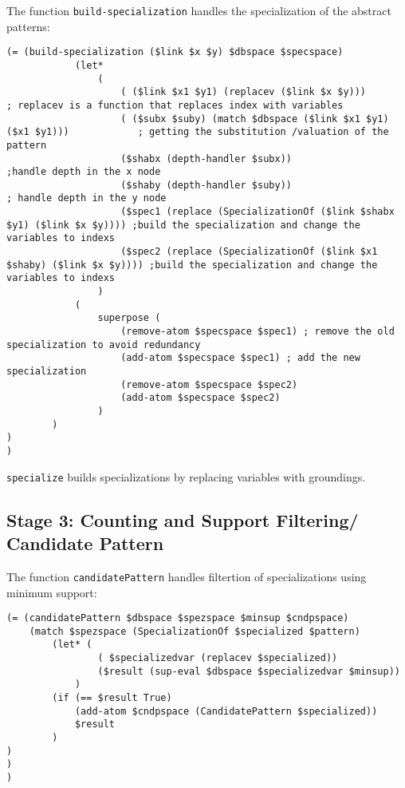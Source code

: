 \documentclass{article}
\begin{document}
The function \texttt{build-specialization} handles the specialization of the abstract patterns:

\begin{verbatim}
(= (build-specialization ($link $x $y) $dbspace $specspace) 
            (let*
                (
                    ( ($link $x1 $y1) (replacev ($link $x $y)))                            ; replacev is a function that replaces index with variables
                    ( ($subx $suby) (match $dbspace ($link $x1 $y1) ($x1 $y1)))            ; getting the substitution /valuation of the pattern
                    ($shabx (depth-handler $subx))                                    ;handle depth in the x node
                    ($shaby (depth-handler $suby))                                    ; handle depth in the y node
                    ($spec1 (replace (SpecializationOf ($link $shabx $y1) ($link $x $y)))) ;build the specialization and change the variables to indexs 
                    ($spec2 (replace (SpecializationOf ($link $x1 $shaby) ($link $x $y)))) ;build the specialization and change the variables to indexs
                )
            (
                superpose (
                    (remove-atom $specspace $spec1) ; remove the old specialization to avoid redundancy
                    (add-atom $specspace $spec1) ; add the new specialization
                    (remove-atom $specspace $spec2)
                    (add-atom $specspace $spec2)
                )
        )
)
)
\end{verbatim}

\texttt{specialize} builds specializations by replacing variables with groundings.

\subsection{Stage 3: Counting and Support Filtering/ Candidate Pattern}

The function \texttt{candidatePattern} handles filtertion of specializations using minimum support:

\begin{verbatim}
(= (candidatePattern $dbspace $spezspace $minsup $cndpspace)
    (match $spezspace (SpecializationOf $specialized $pattern)
        (let* (
                ( $specializedvar (replacev $specialized))
                ($result (sup-eval $dbspace $specializedvar $minsup))
            )
        (if (== $result True)
            (add-atom $cndpspace (CandidatePattern $specialized))
            $result
        )
)
)
)
\end{verbatim}
\end{document}
